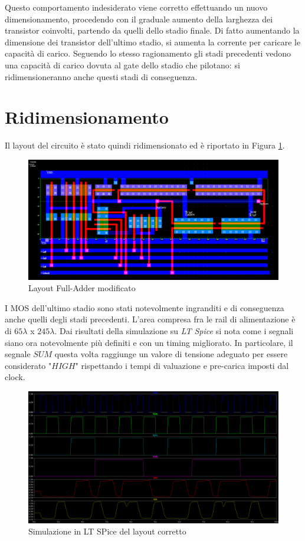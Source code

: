 \documentclass[11pt]{article} %
\begin{document}
Questo comportamento indesiderato viene corretto effettuando un nuovo dimensionamento, procedendo con il graduale aumento della larghezza dei transistor coinvolti, partendo da quelli dello stadio finale.
\newline 
Di fatto aumentando la dimensione dei transistor dell'ultimo stadio, si aumenta la corrente per caricare le capacità di carico.
Seguendo lo stesso ragionamento gli stadi precedenti vedono una capacità di carico dovuta al gate dello stadio che pilotano: si ridimensioneranno anche questi stadi di conseguenza.
\newpage
\section{Ridimensionamento}
Il layout del circuito è stato quindi ridimensionato ed è riportato in Figura \ref{fig:Layout2}.


 \begin{figure}[h]
  \includegraphics[width=\linewidth]{Layout2.png}
  \caption{Layout Full-Adder modificato}
  \label{fig:Layout2}
\end{figure}
 
I MOS dell'ultimo stadio sono stati notevolmente ingranditi e di conseguenza anche quelli degli stadi precedenti.
L'area compresa fra le rail di alimentazione è di $65\lambda$ x $245 \lambda$.
Dai risultati della simulazione su \emph{LT Spice} si nota come i segnali siano ora notevolmente più definiti e con un timing migliorato.
In particolare, il segnale $SUM$ questa volta raggiunge un valore di tensione adeguato per essere considerato "$HIGH$" rispettando i tempi di valuazione e pre-carica imposti dal clock.

\begin{figure}[h!]
  \includegraphics[width=\linewidth]{LT2.png}
  \caption{Simulazione in LT SPice del layout corretto}
  \label{fig:LT2}
\end{figure}
\end{document}
